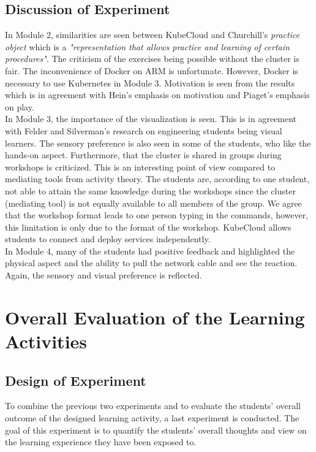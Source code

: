 \subsection*{Discussion of Experiment}
\noindent
In Module 2, similarities are seen between KubeCloud and Churchill's \textit{practice object} which is a \textit{"representation that allows practice and learning of certain procedures"}. The criticism of the exercises being possible without the cluster is fair. The inconvenience of Docker on ARM is unfortunate. However, Docker is necessary to use Kubernetes in Module 3. Motivation is seen from the results which is in agreement with Hein's emphasis on motivation and Piaget's emphasis on play. \\

\noindent In Module 3, the importance of the visualization is seen. This is in agreement with Felder and Silverman's research on engineering students being visual learners. The sensory preference is also seen in some of the students, who like the hands-on aspect. Furthermore, that the cluster is shared in groups during workshops is criticized. This is an interesting point of view compared to mediating tools from activity theory. The students are, according to one student, not able to attain the same knowledge during the workshops since the cluster (mediating tool) is not equally available to all members of the group. We agree that the workshop format leads to one person typing in the commands, however, this limitation is only due to the format of the workshop. KubeCloud allows students to connect and deploy services independently.  \\

\noindent
In Module 4, many of the students had positive feedback and highlighted the physical aspect and the ability to pull the network cable and see the reaction. Again, the sensory and visual preference is reflected.

\section{Overall Evaluation of the Learning Activities}
\subsection*{Design of Experiment}
To combine the previous two experiments and to evaluate the students' overall outcome of the designed learning activity, a last experiment is conducted. The goal of this experiment is to quantify the students' overall thoughts and view on the learning experience they have been exposed to. \\

